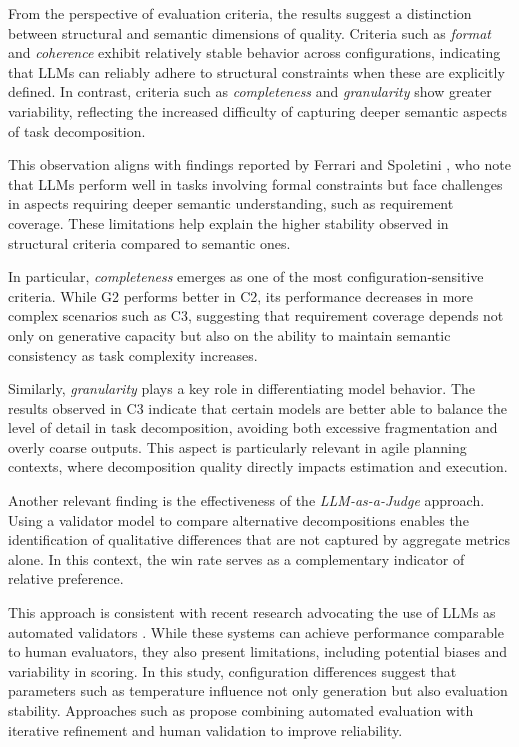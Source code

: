\documentclass[pdflatex,sn-mathphys-num]{sn-jnl}%
\theoremstyle{thmstyleone}%
\theoremstyle{thmstyletwo}%
\theoremstyle{thmstylethree}%
\begin{document}
From the perspective of evaluation criteria, the results suggest a distinction between structural and semantic dimensions of quality. Criteria such as \textit{format} and \textit{coherence} exhibit relatively stable behavior across configurations, indicating that LLMs can reliably adhere to structural constraints when these are explicitly defined. In contrast, criteria such as \textit{completeness} and \textit{granularity} show greater variability, reflecting the increased difficulty of capturing deeper semantic aspects of task decomposition.

This observation aligns with findings reported by Ferrari and Spoletini \cite{proci2025}, who note that LLMs perform well in tasks involving formal constraints but face challenges in aspects requiring deeper semantic understanding, such as requirement coverage. These limitations help explain the higher stability observed in structural criteria compared to semantic ones.

In particular, \textit{completeness} emerges as one of the most configuration-sensitive criteria. While G2 performs better in C2, its performance decreases in more complex scenarios such as C3, suggesting that requirement coverage depends not only on generative capacity but also on the ability to maintain semantic consistency as task complexity increases.

Similarly, \textit{granularity} plays a key role in differentiating model behavior. The results observed in C3 indicate that certain models are better able to balance the level of detail in task decomposition, avoiding both excessive fragmentation and overly coarse outputs. This aspect is particularly relevant in agile planning contexts, where decomposition quality directly impacts estimation and execution.

Another relevant finding is the effectiveness of the \textit{LLM-as-a-Judge} approach. Using a validator model to compare alternative decompositions enables the identification of qualitative differences that are not captured by aggregate metrics alone. In this context, the win rate serves as a complementary indicator of relative preference.

This approach is consistent with recent research advocating the use of LLMs as automated validators \cite{eigler2026}. While these systems can achieve performance comparable to human evaluators, they also present limitations, including potential biases and variability in scoring. In this study, configuration differences suggest that parameters such as temperature influence not only generation but also evaluation stability. Approaches such as \cite{daly2025} propose combining automated evaluation with iterative refinement and human validation to improve reliability.
\end{document}
